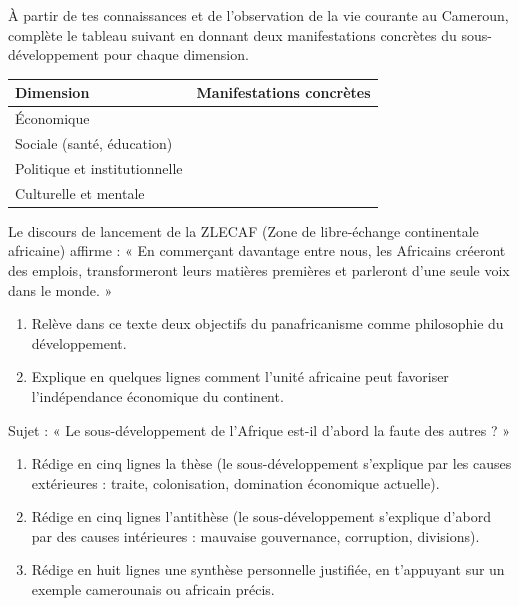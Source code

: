 \documentclass[11pt]{article}
\begin{document}
\begin{exercice}
À partir de tes connaissances et de l'observation de la vie courante au Cameroun, complète le tableau suivant en donnant deux manifestations concrètes du sous-développement pour chaque dimension.
\begin{center}
\begin{tabularx}{\linewidth}{|l|X|}
\hline
\rowcolor{popblueL} \textbf{Dimension} & \textbf{Manifestations concrètes} \\
\hline
Économique & \\
\hline
Sociale (santé, éducation) & \\
\hline
Politique et institutionnelle & \\
\hline
Culturelle et mentale & \\
\hline
\end{tabularx}
\end{center}
\end{exercice}

\begin{exercice}
Le discours de lancement de la ZLECAF (Zone de libre-échange continentale africaine) affirme : « En commerçant davantage entre nous, les Africains créeront des emplois, transformeront leurs matières premières et parleront d'une seule voix dans le monde. »
\begin{enumerate}
\item Relève dans ce texte deux objectifs du panafricanisme comme philosophie du développement.
\item Explique en quelques lignes comment l'unité africaine peut favoriser l'indépendance économique du continent.
\end{enumerate}
\end{exercice}

\begin{exercice}
Sujet : « Le sous-développement de l'Afrique est-il d'abord la faute des autres ? »
\begin{enumerate}
\item Rédige en cinq lignes la thèse (le sous-développement s'explique par les causes extérieures : traite, colonisation, domination économique actuelle).
\item Rédige en cinq lignes l'antithèse (le sous-développement s'explique d'abord par des causes intérieures : mauvaise gouvernance, corruption, divisions).
\item Rédige en huit lignes une synthèse personnelle justifiée, en t'appuyant sur un exemple camerounais ou africain précis.
\end{enumerate}
\end{exercice}
\end{document}
